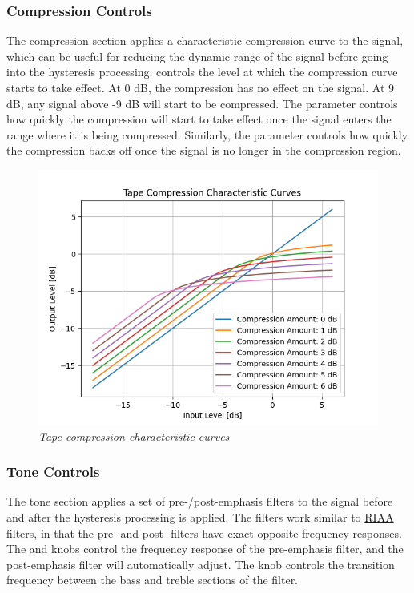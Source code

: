 \documentclass[landscape,twocolumn,a5paper]{manual}
\begin{document}
\subsubsection{Compression Controls}
The compression section applies a characteristic
compression curve to the signal, which can be useful
for reducing the dynamic range of the signal before
going into the hysteresis processing.
\newpar
{} controls the level at which the
compression curve starts to take effect. At 0 dB, the
compression has no effect on the signal. At 9 dB, any
signal above -9 dB will start to be compressed.
\newpar
The  parameter controls how quickly
the compression will start to take effect once the
signal enters the range where it is being compressed.
\newpar
Similarly, the  parameter controls
how quickly the compression backs off once the signal
is no longer in the compression region.
%
\begin{figure}[ht]
    \center
    \includegraphics[width=0.9\columnwidth]{../Simulations/Compression/compression_curves.png}
    \caption{\label{comp_curves}{\it Tape compression characteristic curves}}
\end{figure}

\subsubsection{Tone Controls}
The tone section applies a set of pre-/post-emphasis filters
to the signal before and after the hysteresis processing
is applied. The filters work similar to
\href{https://en.wikipedia.org/wiki/RIAA_equalization}{RIAA filters},
in that the pre- and post- filters have exact opposite frequency
responses.
\newpar
The  and  knobs control
the frequency response of the pre-emphasis filter, and the
post-emphasis filter will automatically adjust. The
 knob controls the transition frequency
between the bass and treble sections of the filter.
\end{document}
